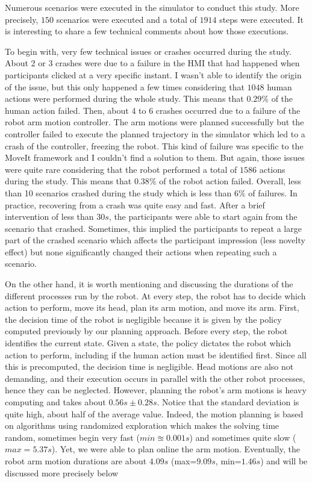 Numerous scenarios were executed in the simulator to conduct this study. More precisely, $150$ scenarios were executed and a total of $1914$ steps were executed. It is interesting to share a few technical comments about how those executions.

To begin with, very few technical issues or crashes occurred during the study.
About 2 or 3 crashes were due to a failure in the HMI that had happened when participants clicked at a very specific instant. I wasn't able to identify the origin of the issue, but this only happened a few times considering that $1048$ human actions were performed during the whole study. This means that $0.29\%$ of the human action failed. 
Then, about 4 to 6 crashes occurred due to a failure of the robot arm motion controller. The arm motions were planned successfully but the controller failed to execute the planned trajectory in the simulator which led to a crash of the controller, freezing the robot. This kind of failure was specific to the MoveIt framework and I couldn't find a solution to them. But again, those issues were quite rare considering that the robot performed a total of $1586$ actions during the study. This means that $0.38\%$ of the robot action failed. 
Overall, less than 10 scenarios crashed during the study which is less than $6\%$ of failures. 
In practice, recovering from a crash was quite easy and fast. After a brief intervention of less than $30s$, the participants were able to start again from the scenario that crashed. Sometimes, this implied the participants to repeat a large part of the crashed scenario which affects the participant impression (less novelty effect) but none significantly changed their actions when repeating such a scenario.


On the other hand, it is worth mentioning and discussing the durations of the different processes run by the robot.
At every step, the robot has to decide which action to perform, move its head, plan its arm motion, and move its arm. First, the decision time of the robot is negligible because it is given by the policy computed previously by our planning approach. Before every step, the robot identifies the current state. Given a state, the policy dictates the robot which action to perform, including if the human action must be identified first. Since all this is precomputed, the decision time is negligible. 
Head motions are also not demanding, and their execution occurs in parallel with the other robot processes, hence they can be neglected.
However, planning the robot's arm motions is heavy computing and takes about $0.56s \pm 0.28s$. Notice that the standard deviation is quite high, about half of the average value. Indeed, the motion planning is based on algorithms using randomized exploration which makes the solving time random, sometimes begin very fast ($min \approxeq 0.001s$) and sometimes quite slow ($max = 5.37s $). Yet, we were able to plan online the arm motion.
Eventually, the robot arm motion durations are about $4.09s$ (max=$9.09s$, min=$1.46s$) and will be discussed more precisely below

